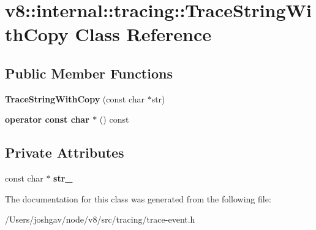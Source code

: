 \hypertarget{classv8_1_1internal_1_1tracing_1_1_trace_string_with_copy}{}\section{v8\+:\+:internal\+:\+:tracing\+:\+:Trace\+String\+With\+Copy Class Reference}
\label{classv8_1_1internal_1_1tracing_1_1_trace_string_with_copy}
\subsection*{Public Member Functions}
\begin{DoxyCompactItemize}
\item 
{\bfseries Trace\+String\+With\+Copy} (const char $\ast$str)\hypertarget{classv8_1_1internal_1_1tracing_1_1_trace_string_with_copy_a7b965fc3bb7e32b0f2e7d3c3550069e2}{}\label{classv8_1_1internal_1_1tracing_1_1_trace_string_with_copy_a7b965fc3bb7e32b0f2e7d3c3550069e2}

\item 
{\bfseries operator const char $\ast$} () const \hypertarget{classv8_1_1internal_1_1tracing_1_1_trace_string_with_copy_a68c13f59c967c12211b55b1c59c37df9}{}\label{classv8_1_1internal_1_1tracing_1_1_trace_string_with_copy_a68c13f59c967c12211b55b1c59c37df9}

\end{DoxyCompactItemize}
\subsection*{Private Attributes}
\begin{DoxyCompactItemize}
\item 
const char $\ast$ {\bfseries str\+\_\+}\hypertarget{classv8_1_1internal_1_1tracing_1_1_trace_string_with_copy_a85554633e6b25674b26ed63ff0179f4d}{}\label{classv8_1_1internal_1_1tracing_1_1_trace_string_with_copy_a85554633e6b25674b26ed63ff0179f4d}

\end{DoxyCompactItemize}


The documentation for this class was generated from the following file\+:\begin{DoxyCompactItemize}
\item 
/\+Users/joshgav/node/v8/src/tracing/trace-\/event.\+h\end{DoxyCompactItemize}
